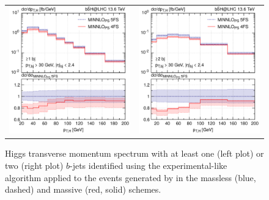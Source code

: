 \documentclass[11pt,a4paper]{article}
\begin{document}

\begin{figure}[t!]
\begin{center}
\begin{tabular}{cc}
\includegraphics[width=.45\textwidth, page=1]{plots/4fs/pt_H-EXP-1bjet.pdf}&
\includegraphics[width=.45\textwidth, page=1]{plots/4fs/pt_H-EXP-2bjet.pdf}
\end{tabular}
\vspace*{1ex}
\caption{Higgs transverse momentum spectrum with at least one (left plot) or two (right plot) $b$-jets identified using the experimental-like algorithm applied to the events generated by \minnlo{} in the massless (blue, dashed) and massive (red, solid) schemes.\label{fig:4fs}}
\end{center}
\end{figure}
 
\end{document}

